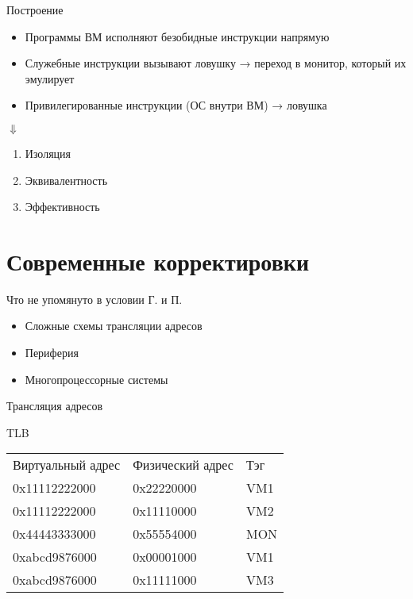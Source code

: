 \documentclass{beamer}
\begin{document}
\begin{frame}{Построение}
\begin{itemize}
    \item Программы ВМ исполняют безобидные инструкции напрямую
    \item Служебные инструкции вызывают ловушку → переход в монитор, который их эмулирует
    \item Привилегированные инструкции (ОС внутри ВМ) → ловушка
\end{itemize}

\centering$\Downarrow$

\begin{enumerate}
    \item Изоляция
    \item Эквивалентность
    \item Эффективность
\end{enumerate}
\end{frame}

\section{Современные корректировки}

\begin{frame}{Что не упомянуто в условии Г. и П.}

\begin{itemize}
    \item Сложные схемы трансляции адресов
    \item Периферия
    \item Многопроцессорные системы
\end{itemize}
\end{frame}

\begin{frame}[shrink=20]{Трансляция адресов}
\centering
 
\end{frame}

\begin{frame}{TLB}
\begin{center}
\begin{tabular}{lll}
Виртуальный адрес & Физический адрес & Тэг\\
0x11112222000 &  0x22220000 & VM1\\
0x11112222000 &  0x11110000 & VM2\\
0x44443333000 &  0x55554000 & MON\\
0xabcd9876000 &  0x00001000 & VM1\\
0xabcd9876000 &  0x11111000 & VM3
 \end{tabular}
\end{center}
\end{frame}
\end{document}
